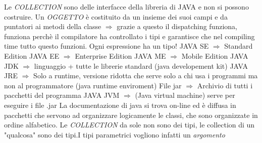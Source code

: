 Le \textit{COLLECTION} sono delle interfacce della libreria di JAVA e non si possono costruire.
\newline
Un \textit{OGGETTO} è costituito da un insieme dei suoi campi e da puntatori ai metodi della classe $\Rightarrow$ grazie a questo il dispatching funziona, funziona perchè il compilatore ha controllato i tipi e garantisce che nel compiling time tutto questo funzioni. \newline
Ogni espressione ha un tipo!
\newline
JAVA SE $\Rightarrow$ Standard Edition \newline
JAVA EE $\Rightarrow$ Enterprise Edition \newline
JAVA ME $\Rightarrow$ Mobile Edition \newline
JAVA JDK $\Rightarrow$ linguaggio + tutte le librerie standard (java developement kit) \newline
JAVA JRE $\Rightarrow$ Solo a runtime, versione ridotta che serve solo a chi usa i programmi ma non al programmatore (java runtime enviroment) \newline
File jar  $\Rightarrow$ Archivio di tutti i pacchetti del programma \newline
JAVA JVM $\Rightarrow$ (Java virtual machine) serve per eseguire i file .jar \newline
La documentazione di java si trova on-line ed è diffusa in pacchetti che servono ad organizzare logicamente le classi, che sono organizzate in ordine alfabetico. \newline
Le \textit{COLLECTION} da sole non sono dei tipi, le collection di un "qualcosa" sono dei tipi.I tipi parametrici vogliono infatti un \textit{argomento}




\newpage











